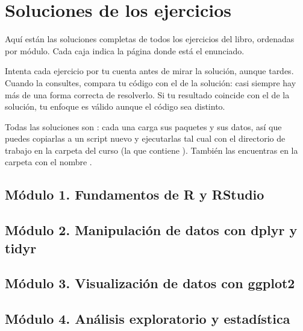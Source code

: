 \chapter{Soluciones de los ejercicios}
\label{ap:soluciones}

Aquí están las soluciones completas de todos los ejercicios del libro,
ordenadas por módulo. Cada caja indica la página donde está el enunciado.

\begin{consejo}
Intenta cada ejercicio por tu cuenta antes de mirar la solución, aunque tardes.
Cuando la consultes, compara tu código con el de la solución: casi siempre hay
más de una forma correcta de resolverlo. Si tu resultado coincide con el de la
solución, tu enfoque es válido aunque el código sea distinto.
\end{consejo}

Todas las soluciones son : cada una carga sus paquetes y
sus datos, así que puedes copiarlas a un script nuevo y ejecutarlas tal cual con
el directorio de trabajo en la carpeta del curso (la que contiene
). También las encuentras en la carpeta
 con el nombre .

\section{Módulo 1. Fundamentos de R y RStudio}


\section{Módulo 2. Manipulación de datos con dplyr y tidyr}


\section{Módulo 3. Visualización de datos con ggplot2}


\section{Módulo 4. Análisis exploratorio y estadística}


